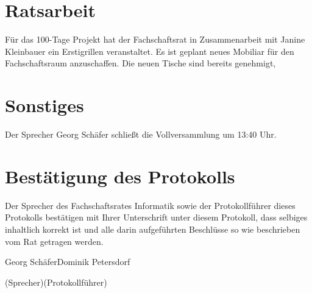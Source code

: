 \documentclass[a4paper, 11pt]{article} %
\newcommand{\TeXer}{Dominik Petersdorf}
\newcommand{\fsiPresident}{Georg Schäfer}
\begin{document}
\section{Ratsarbeit}
\begin{flushleft}
	Für das 100-Tage Projekt hat der Fachschaftsrat in Zusammenarbeit mit Janine Kleinbauer ein Erstigrillen veranstaltet. Es ist geplant neues Mobiliar für den Fachschaftsraum anzuschaffen. Die neuen Tische sind bereits genehmigt, 
\end{flushleft}
\section{Sonstiges}

Der Sprecher Georg Schäfer schließt die Vollversammlung um 13:40 Uhr.

\pagebreak
\section{Bestätigung des Protokolls}
Der Sprecher des Fachschaftsrates Informatik sowie der Protokollführer dieses Protokolls bestätigen mit Ihrer Unterschrift unter diesem Protokoll, dass selbiges inhaltlich korrekt ist und alle darin aufgeführten Beschlüsse so wie beschrieben vom Rat getragen werden.
\\
\vspace{1.5cm}


\vspace{3.5cm}
\hrulefill \hfill \hrulefill

\fsiPresident \hfill \TeXer

{\footnotesize (Sprecher)\hfill (Protokollführer)}
\end{document}
